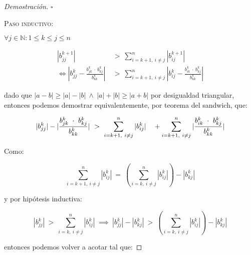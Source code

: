 \begin{proof}[Demostración]
\hfill$\square$


\vspace{2em}
\noindent \textsc{Paso inductivo}:

\vspace{1em}
\noindent $\forall j \in \mathbb{N}: 1 \leq k \leq j \leq n$

\begin{align*}
    |b^{k+1}_{jj}|\ 
        &>\ \sum_{i = k+1,\ i \neq j}^{n} |b^{k+1}_{ij}| \\
    \iff |b^k_{jj} - \frac {b^k_{jk} \ \cdot \ b^k_{kj}}{b^k_{kk}}|\     
        &>\ \sum_{i=k+1,\ i \neq j}^{n} |b^k_{ij} - \frac {b^k_{ik} \ \cdot \ b^k_{kj}}{b^k_{kk}}|
\end{align*}

\vspace{1em}
\noindent dado que $|a - b| \geq |a| - |b|\ \wedge\ |a| + |b| \geq |a + b|$ por desigualdad triangular, entonces podemos demostrar equivalentemente, por teorema del sandwich, que:

\begin{equation*}
    |b^k_{jj}| - |\frac {b^k_{jk} \ \cdot \ b^k_{kj}}{b^k_{kk}}|\  
        >\ \sum_{i=k+1,\ i \neq j}^{n} |b^k_{ij}|\ \ \  +  \sum_{i=k+1,\ i \neq j}^{n} |\frac{b^k_{ik} \ \cdot \ b^k_{kj}}{b^k_{kk}}| \\
\end{equation*} 

\vspace{1em}
\noindent Como:

\begin{equation*}
    \sum_{i=k+1,\ i \neq j}^{n} |b^k_{ij}|\ 
        =\ (\sum_{i=k, \ i \neq j}^{n} |b^k_{ij}|) -  |b^k_{kj}|
\end{equation*}

\vspace{1em}
\noindent y por hipótesis inductiva:

\begin{equation*}
    |b^k_{jj}|\
        >\ \sum_{i=k, \ i \neq j}^{n} |b^k_{ij}|\
    \implies\
    |b^k_{jj}| - |b^k_{kj}|\
        >\ (\sum_{i=k, \ i \neq j}^{n} |b^k_{ij}|) -  |b^k_{kj}|
\end{equation*}

\vspace{1em}
\noindent entonces podemos volver a acotar tal que:


\end{proof}
